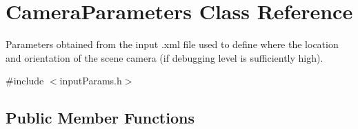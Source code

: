 \hypertarget{classCameraParameters}{\section{Camera\-Parameters Class Reference}
\label{classCameraParameters}
}


Parameters obtained from the input .xml file used to define where the location and orientation of the scene camera (if debugging level is sufficiently high).  




{\ttfamily \#include $<$input\-Params.\-h$>$}

\subsection*{Public Member Functions}
